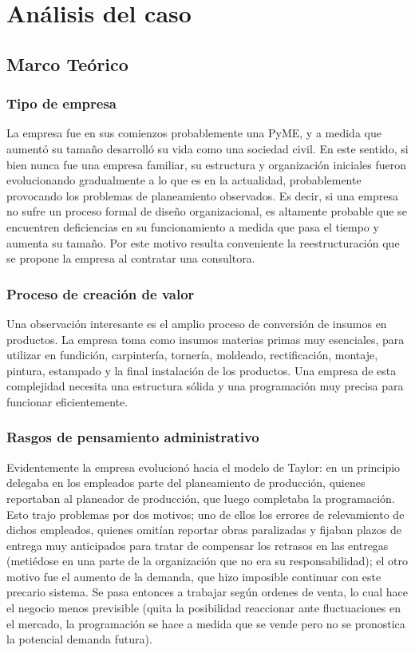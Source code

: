 \newpage
\section{An\'{a}lisis del caso}

\subsection{Marco Te\'orico}

\subsubsection{Tipo de empresa}
La empresa fue en sus comienzos probablemente una PyME, y a medida que aument\'o su tama\~no desarroll\'o su vida como una sociedad civil. En este sentido, si bien nunca fue una empresa familiar, su estructura y organizaci\'on iniciales fueron evolucionando gradualmente a lo que es en la actualidad, probablemente provocando los problemas de planeamiento observados. Es decir, si una empresa no sufre un proceso formal de dise\~no organizacional, es altamente probable que se encuentren deficiencias en su funcionamiento a medida que pasa el tiempo y aumenta su tama\~no. Por este motivo resulta conveniente la reestructuraci\'on que se propone la empresa al contratar una consultora.

\subsubsection{Proceso de creaci\'on de valor}
Una observaci\'on interesante es el amplio proceso de conversi\'on de insumos en productos. La empresa toma como insumos materias primas muy esenciales, para utilizar en fundici\'on, carpinter\'ia, torner\'ia, moldeado, rectificaci\'on, montaje, pintura, estampado y la final instalaci\'on de los productos. Una empresa de esta complejidad necesita una estructura s\'olida y una programaci\'on muy precisa para funcionar eficientemente.

\subsubsection{Rasgos de pensamiento administrativo}
Evidentemente la empresa evolucion\'o hacia el modelo de Taylor: en un principio delegaba en los empleados parte del planeamiento de producci\'on, quienes reportaban al planeador de producci\'on, que luego completaba la programaci\'on. Esto trajo problemas por dos motivos; uno de ellos los errores de relevamiento de dichos empleados, quienes omit\'ian reportar obras paralizadas y fijaban plazos de entrega muy anticipados para tratar de compensar los retrasos en las entregas (meti\'edose en una parte de la organizaci\'on que no era su responsabilidad); el otro motivo fue el aumento de la demanda, que hizo imposible continuar con este precario sistema. Se pasa entonces a trabajar seg\'{u}n ordenes de venta, lo cual hace el negocio menos previsible (quita la posibilidad reaccionar ante fluctuaciones en el mercado, la programaci\'on se hace a medida que se vende pero no se pronostica la potencial demanda futura).

